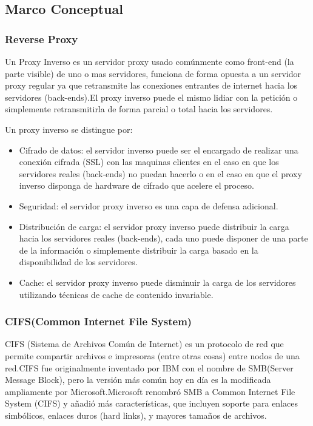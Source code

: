 \subsection{Marco Conceptual}

\subsubsection*{Reverse Proxy}

Un Proxy Inverso es un servidor proxy usado comúnmente como front-end (la parte visible) de uno o mas servidores, funciona de forma opuesta a un servidor proxy regular ya que retransmite las conexiones entrantes de internet hacia los servidores (back-ends).\newline El proxy inverso puede el mismo lidiar con la petición o simplemente retransmitirla de forma parcial o total hacia los servidores.

Un proxy inverso se distingue por:

\begin{itemize}

	\item Cifrado de datos: el servidor inverso puede ser el encargado de realizar una conexión cifrada (SSL) con las maquinas clientes en el caso en que los servidores reales (back-ends) no puedan hacerlo o en el caso en que el proxy inverso disponga de hardware de cifrado que acelere el proceso.
	
	\item Seguridad: el servidor proxy inverso es una capa de defensa adicional.
	
	\item Distribución de carga: el servidor proxy inverso puede distribuir la carga	hacia los servidores reales (back-ends), cada uno puede disponer de una parte de la información o simplemente distribuir la carga basado en la disponibilidad de los servidores.
	
	\item Cache: el servidor proxy inverso puede disminuir la carga de los servidores utilizando técnicas de cache de contenido invariable.

\end{itemize}


\subsubsection*{CIFS(Common Internet File System)}

CIFS (Sistema de Archivos Común de Internet) es un protocolo de red que permite compartir archivos e impresoras (entre otras cosas) entre nodos de una red.\newline CIFS fue originalmente inventado por IBM con el nombre de SMB(Server Message Block), pero la versión más común hoy en día es la modificada ampliamente por Microsoft.\newline  Microsoft renombró SMB a Common Internet File System (CIFS) y añadió más características, que incluyen soporte para enlaces simbólicos, enlaces duros (hard links), y mayores tamaños de archivos.


